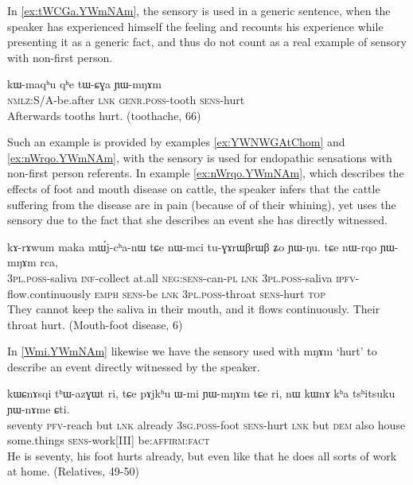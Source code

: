 \documentclass[oldfontcommands,oneside,a4paper,11pt]{article}
\newcommand{\ipa}[1]{{\phon \mbox{#1}}} %
\newcommand{\factual}[1]{\textsc{:fact}}
\begin{document}
In \ref{ex:tWCGa.YWmNAm}, the sensory is used in a generic sentence, when the speaker has experienced himself the feeling and recounts his experience while presenting it as a generic fact, and thus do not count as a real example of sensory with non-first person.

\begin{exe}
\ex \label{ex:tWCGa.YWmNAm}
\gll
\ipa{kɯ-maqʰu}  	\ipa{qʰe}  	\ipa{tɯ-ɕɣa}  	\ipa{ɲɯ-mŋɤm}  \\
\textsc{nmlz}:S/A-be.after \textsc{lnk} \textsc{genr.poss}-tooth \textsc{sens}-hurt \\
\glt Afterwards tooths hurt. (toothache, 66)
\end{exe}

Such an example is provided by examples \ref{ex:YWNWGAtChom} and \ref{ex:nWrqo.YWmNAm},  with the sensory is used for endopathic sensations with non-first person referents. In example \ref{ex:nWrqo.YWmNAm}, which describes the effects of foot and mouth disease on cattle, the speaker  infers that the cattle suffering from the disease are in pain (because of of their whining), yet uses the sensory due to the fact that she describes an event she has directly witnessed. 

\begin{exe}
\ex \label{ex:nWrqo.YWmNAm}
\gll \ipa{nɯ-mci} 	\ipa{kɤ-rɤwum} 	\ipa{maka} 	\ipa{mɯ́j-cʰa-nɯ} 	\ipa{tɕe} 	\ipa{nɯ-mci} 	\ipa{tu-ɣɤrɯβrɯβ} 	\ipa{ʑo} 	\ipa{ɲɯ-ŋu.}  
\ipa{tɕe} 	\ipa{nɯ-rqo} 	\ipa{ɲɯ-mŋɤm} 	\ipa{rca,} \\
\textsc{3pl.poss}-saliva \textsc{inf}-collect at.all \textsc{neg:sens}-can-\textsc{pl} \textsc{lnk} \textsc{3pl.poss}-saliva \textsc{ipfv}-flow.continuously \textsc{emph} \textsc{sens}-be \textsc{lnk} \textsc{3pl.poss}-throat \textsc{sens}-hurt \textsc{top}  \\
\glt They cannot keep the saliva in their mouth, and it flows continuously. Their throat hurt. (Mouth-foot disease, 6)
\end{exe}

In \ref{Wmi.YWmNAm} likewise we have the sensory used with \ipa{mŋɤm} `hurt' to describe an event directly witnessed by the speaker.

\begin{exe}
\ex \label{Wmi.YWmNAm}
\gll
\ipa{kɯɕnɤsqi} 	\ipa{tʰɯ-azɣɯt} 	\ipa{ri,} \ipa{tɕe} 	\ipa{pɤjkʰu} 	\ipa{ɯ-mi} 	\ipa{ɲɯ-mŋɤm} 	\ipa{tɕe} 	\ipa{ri,} 	\ipa{nɯ} 	\ipa{kɯnɤ} 	\ipa{kʰa} 	\ipa{tsʰitsuku} 	\ipa{ɲɯ-nɤme} 	\ipa{ɕti.} \\
seventy \textsc{pfv}-reach but \textsc{lnk} already \textsc{3sg.poss}-foot \textsc{sens}-hurt \textsc{lnk} but \textsc{dem} also house some.things \textsc{sens}-work[III] be:\textsc{affirm}\factual{} \\
\glt He is seventy, his foot hurts already, but even like that he does all sorts of work at home. (Relatives, 49-50)
\end{exe}
\end{document}
